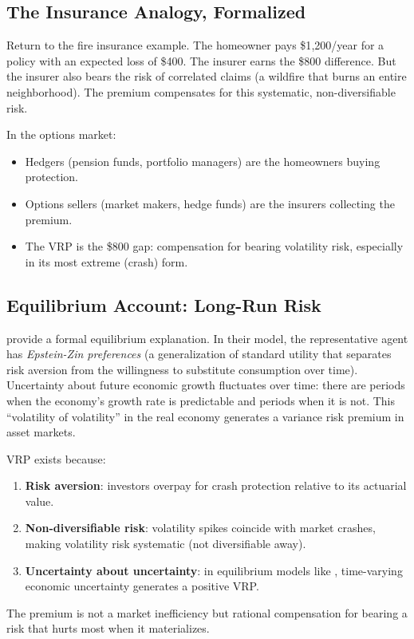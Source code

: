 \subsection{The Insurance Analogy, Formalized}

Return to the fire insurance example.
The homeowner pays \$1{,}200/year for a policy with an expected loss of \$400.
The insurer earns the \$800 difference.
But the insurer also bears the risk of correlated claims (a wildfire that burns an entire neighborhood).
The premium compensates for this systematic, non-diversifiable risk.

In the options market:
\begin{itemize}[nosep]
  \item Hedgers (pension funds, portfolio managers) are the homeowners buying protection.
  \item Options sellers (market makers, hedge funds) are the insurers collecting the premium.
  \item The VRP is the \$800 gap: compensation for bearing volatility risk, especially in its most extreme (crash) form.
\end{itemize}

\subsection{Equilibrium Account: Long-Run Risk}

\citet{DrechslerYaron2011} provide a formal equilibrium explanation.
In their model, the representative agent has \emph{Epstein-Zin preferences} (a generalization of standard utility that separates risk aversion from the willingness to substitute consumption over time).
Uncertainty about future economic growth fluctuates over time: there are periods when the economy's growth rate is predictable and periods when it is not.
This ``volatility of volatility'' in the real economy generates a variance risk premium in asset markets.

\begin{keyidea}
VRP exists because:
\begin{enumerate}[nosep]
  \item \textbf{Risk aversion}: investors overpay for crash protection relative to its actuarial value.
  \item \textbf{Non-diversifiable risk}: volatility spikes coincide with market crashes, making volatility risk systematic (not diversifiable away).
  \item \textbf{Uncertainty about uncertainty}: in equilibrium models like \citet{DrechslerYaron2011}, time-varying economic uncertainty generates a positive VRP.
\end{enumerate}
The premium is not a market inefficiency but rational compensation for bearing a risk that hurts most when it materializes.
\end{keyidea}



